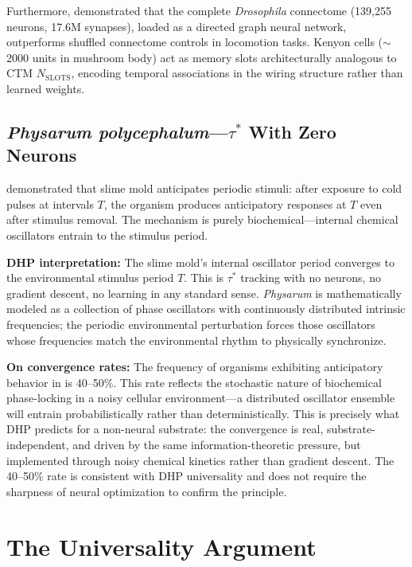 \documentclass[12pt]{article}
\begin{document}
Furthermore, \citet{jin2026whole} demonstrated that the complete \textit{Drosophila}
connectome (139,255 neurons, 17.6M synapses), loaded as a directed graph neural network,
outperforms shuffled connectome controls in locomotion tasks. Kenyon cells ($\sim$2000 units
in mushroom body) act as memory slots architecturally analogous to CTM $N_{\text{SLOTS}}$,
encoding temporal associations in the wiring structure rather than learned weights.

\subsection{\textit{Physarum polycephalum}---$\tau^*$ With Zero Neurons}

\citet{saigusa2008amoebae} demonstrated that slime mold anticipates periodic stimuli: after
exposure to cold pulses at intervals $T$, the organism produces anticipatory responses at
$T$ even after stimulus removal. The mechanism is purely biochemical---internal chemical
oscillators entrain to the stimulus period.

\textbf{DHP interpretation:} The slime mold's internal oscillator period converges to the
environmental stimulus period $T$. This is $\tau^*$ tracking with no neurons, no gradient
descent, no learning in any standard sense. \textit{Physarum} is mathematically modeled as
a collection of phase oscillators with continuously distributed intrinsic frequencies; the
periodic environmental perturbation forces those oscillators whose frequencies match the
environmental rhythm to physically synchronize.

\textbf{On convergence rates:} The frequency of organisms exhibiting anticipatory behavior
in \citet{saigusa2008amoebae} is 40--50\%. This rate reflects the stochastic nature of
biochemical phase-locking in a noisy cellular environment---a distributed oscillator ensemble
will entrain probabilistically rather than deterministically. This is precisely what DHP
predicts for a non-neural substrate: the convergence is real, substrate-independent, and
driven by the same information-theoretic pressure, but implemented through noisy chemical
kinetics rather than gradient descent. The 40--50\% rate is consistent with DHP universality
and does not require the sharpness of neural optimization to confirm the principle.

\section{The Universality Argument}
\label{sec:universality}
\end{document}
